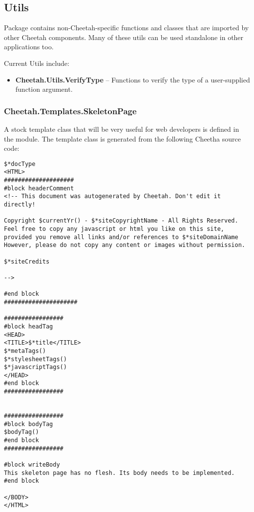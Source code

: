\subsection{Utils}
\label{libraries.Utils}

Package  contains non-Cheetah-specific functions and
classes that are imported by other Cheetah components.  Many of these utils can
be used standalone in other applications too.  

Current Utils include:
\begin{itemize}
\item {\bf Cheetah.Utils.VerifyType} -- Functions to verify the type of a
     user-supplied function argument.
\end{itemize}

\subsubsection{Cheetah.Templates.SkeletonPage}
\label{libraries.templates.skeletonPage}

A stock template class that will be very useful for web developers is defined in
the  module.  The 
template class is generated from the following Cheetha source code:

\begin{verbatim}
$*docType
<HTML>
####################
#block headerComment
<!-- This document was autogenerated by Cheetah. Don't edit it directly!

Copyright $currentYr() - $*siteCopyrightName - All Rights Reserved.
Feel free to copy any javascript or html you like on this site,
provided you remove all links and/or references to $*siteDomainName
However, please do not copy any content or images without permission.

$*siteCredits

-->

#end block 
#####################

#################
#block headTag
<HEAD>
<TITLE>$*title</TITLE>
$*metaTags()
$*stylesheetTags()
$*javascriptTags()
</HEAD>
#end block 
#################


#################
#block bodyTag
$bodyTag()
#end block 
#################

#block writeBody
This skeleton page has no flesh. Its body needs to be implemented.
#end block 

</BODY>
</HTML>
\end{verbatim}

